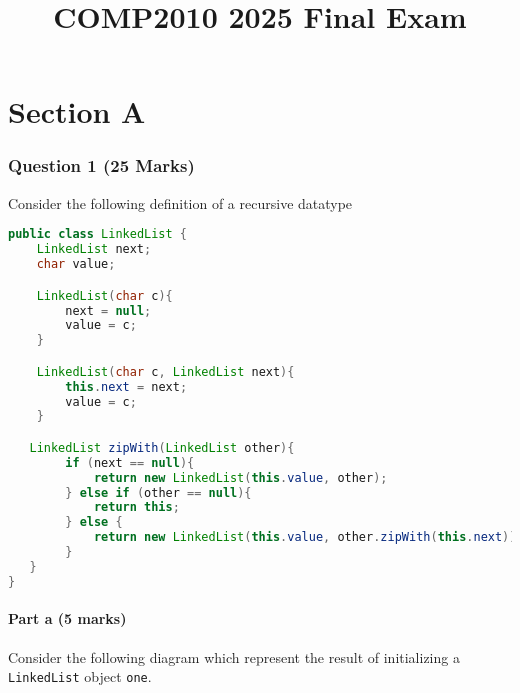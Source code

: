 \documentclass[twoside=false,DIV=14]{scrartcl}
\title{\color{redish} \vspace{-2em}COMP2010 2025 Final Exam}
\begin{document}
{\color{blackish}\maketitle}\vspace{-2em}

\part*{Section A}
\section*{Question 1 (25 Marks)}
Consider the following definition of a recursive datatype
\begin{lstlisting}[language=java]
public class LinkedList {
    LinkedList next;
    char value;

    LinkedList(char c){
        next = null;
        value = c;
    }

    LinkedList(char c, LinkedList next){
        this.next = next;
        value = c;
    }

   LinkedList zipWith(LinkedList other){
        if (next == null){
            return new LinkedList(this.value, other);
        } else if (other == null){
            return this;
        } else {
            return new LinkedList(this.value, other.zipWith(this.next));
        }
   }
}
\end{lstlisting}

\subsection*{Part a (5 marks)}
Consider the following diagram which represent the result of initializing a \lstinline{LinkedList} object \lstinline{one}.

\vspace{2em}
\end{document}
